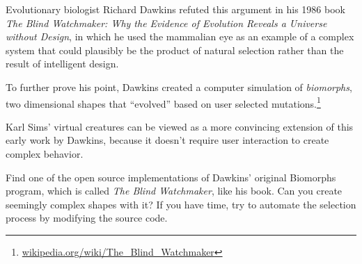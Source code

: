 \documentclass[10pt]{book}
\begin{document}
Evolutionary biologist Richard Dawkins refuted this argument in his 1986 book
{\em The Blind Watchmaker: Why the Evidence of Evolution Reveals a Universe
without Design}, in which he used the mammalian eye as an example of a complex
system that could plausibly be the product of natural selection rather than the
result of intelligent design.

To further prove his point, Dawkins created a computer simulation of {\em
biomorphs}, two dimensional shapes that ``evolved'' based on user selected
mutations.\footnote{\url{wikipedia.org/wiki/The_Blind_Watchmaker}}

Karl Sims' virtual creatures can be viewed as a more convincing extension of this early work by
Dawkins, because it doesn't require user interaction to create complex behavior.

\begin{ex} %
  Find one of the open source implementations of Dawkins' original Biomorphs
  program, which is called {\em The Blind Watchmaker}, like his book. Can you create 
  seemingly complex shapes with it? If you have time, try to automate the selection process
  by modifying the source code. 
\end{ex}

\printindex

\clearemptydoublepage

\end{document}
